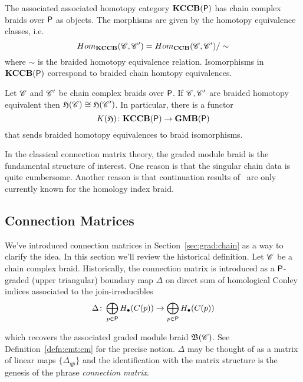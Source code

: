  The associated associated homotopy category ${\bf KCCB({\mathsf P})}$ has chain complex braids over ${\mathsf P}$ as objects.  The morphisms are given by the homotopy equivalence classes, i.e. $$Hom_{\bf KCCB}(\mathscr{C},\mathscr{C}') = Hom_{\bf CCB}(\mathscr{C},\mathscr{C}')\slash\sim$$ where $\sim$ is the braided homotopy equivalence relation.  Isomorphisms in ${\bf KCCB({\mathsf P})}$ correspond to braided chain homtopy equivalences. 

\begin{prop}\label{prop:braid:functor}
Let $\mathscr{C}$ and $\mathscr{C}'$ be chain complex braids over ${\mathsf P}$.  If $\mathscr{C},\mathscr{C}'$ are braided homotopy equivalent then $\mathfrak{H}(\mathscr{C})\cong \mathfrak{H}(\mathscr{C}')$.  In particular, there is a functor
\[
K(\mathfrak{H})\colon {\bf KCCB({\mathsf P})} \to {\bf GMB}({\mathsf P})
\]
 that sends braided homotopy equivalences to braid isomorphisms.
\end{prop}

\begin{rem}
In the classical connection matrix theory, the graded module braid is the fundamental structure of interest.  One reason is that the singular chain data is quite cumbersome.  Another reason is that continuation results of~\cite{fran3}  are only currently known for the homology index braid.
\end{rem}


\subsection{Connection Matrices}

We've introduced connection matrices in Section~\ref{sec:grad:chain} as a way to clarify the idea.  In this section we'll review the historical definition.  Let $\mathscr{C}$ be a chain complex braid.  Historically, the connection matrix is introduced as a ${\mathsf P}$-graded (upper triangular) boundary map $\Delta$ on direct sum of homological Conley indices associated to the join-irreducibles $$\Delta\colon \bigoplus_{p\in {\mathsf P}} H_\bullet(C(p))\to  \bigoplus_{p\in {\mathsf P}} H_\bullet(C(p))$$

which recovers the associated graded module braid $\mathfrak{B}(\mathscr{C})$.  See Definition~\ref{defn:cmt:cm} for the precise notion.   $\Delta$ may be thought of as a matrix of linear maps $\{\Delta_{qp}\}$ and the identification with the matrix structure is the genesis of the phrase {\em connection matrix}.  

